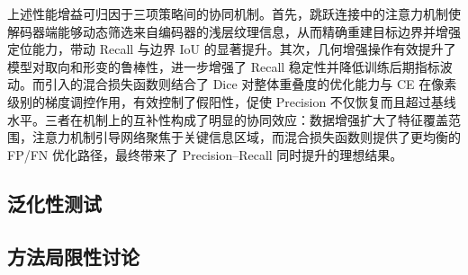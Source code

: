 上述性能增益可归因于三项策略间的协同机制。首先，跳跃连接中的注意力机制使解码器端能够动态筛选来自编码器的浅层纹理信息，从而精确重建目标边界并增强定位能力，带动 Recall 与边界 IoU 的显著提升。其次，几何增强操作有效提升了模型对取向和形变的鲁棒性，进一步增强了 Recall 稳定性并降低训练后期指标波动。而引入的混合损失函数则结合了 Dice 对整体重叠度的优化能力与 CE 在像素级别的梯度调控作用，有效控制了假阳性，促使 Precision 不仅恢复而且超过基线水平。三者在机制上的互补性构成了明显的协同效应：数据增强扩大了特征覆盖范围，注意力机制引导网络聚焦于关键信息区域，而混合损失函数则提供了更均衡的 FP/FN 优化路径，最终带来了 Precision–Recall 同时提升的理想结果。

\subsection{泛化性测试}


\subsection{方法局限性讨论}
